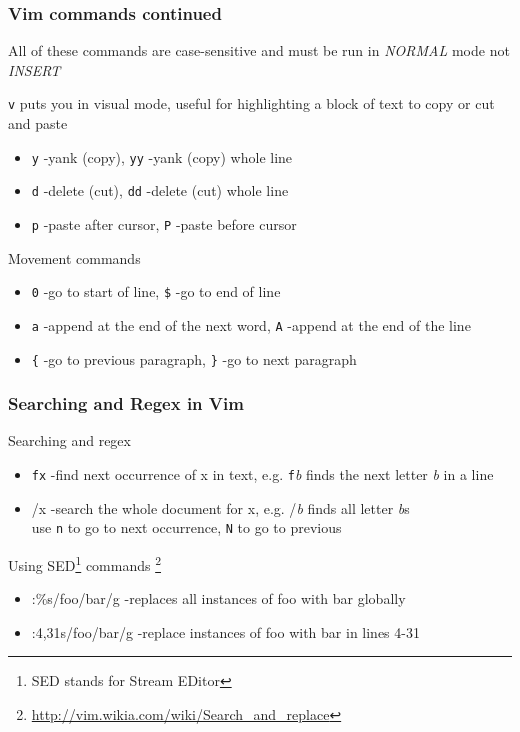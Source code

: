 \documentclass{beamer}
\begin{document}
\begin{frame}
    \frametitle{Vim commands continued}
    All of these commands are case-sensitive and must be run in \textit{NORMAL} mode not \textit{INSERT} 

    \texttt{v} puts you in visual mode, useful for highlighting a block of text to copy or cut and paste
    \begin{itemize}
        \item \texttt{y} -yank (copy), \texttt{yy} -yank (copy) whole line
        \item \texttt{d} -delete (cut), \texttt{dd} -delete (cut) whole line
        \item \texttt{p} -paste after cursor, \texttt{P} -paste before cursor
    \end{itemize}
    
    Movement commands
    \begin{itemize}
    \item \texttt{0} -go to start of line, \texttt{\$} -go to end of line
    \item \texttt{a} -append at the end of the next word, \texttt{A} -append at the end of the line
    \item \texttt{\{} -go to previous paragraph, \texttt{\}} -go to next paragraph 
    \end{itemize}
\end{frame}

\begin{frame}
    \frametitle{Searching and Regex in Vim}
    Searching and regex
    \begin{itemize}
    \item \texttt{fx} -find next occurrence of x in text, e.g. \texttt{f}\textit{b} finds the next letter \textit{b} in a line 
    \item /x -search the whole document for x, e.g. /\textit{b} finds all letter \textit{b}s \\ 
        use \texttt{n} to go to next occurrence, \texttt{N} to go to previous
\end{itemize}
Using SED\footnote{SED stands for Stream EDitor} commands \footnote{\url{http://vim.wikia.com/wiki/Search_and_replace}} 
\begin{itemize}
    \item :\%s/foo/bar/g -replaces all instances of foo with bar globally
    \item :4,31s/foo/bar/g -replace instances of foo with bar in lines 4-31 
\end{itemize}
\end{frame}
\end{document}
